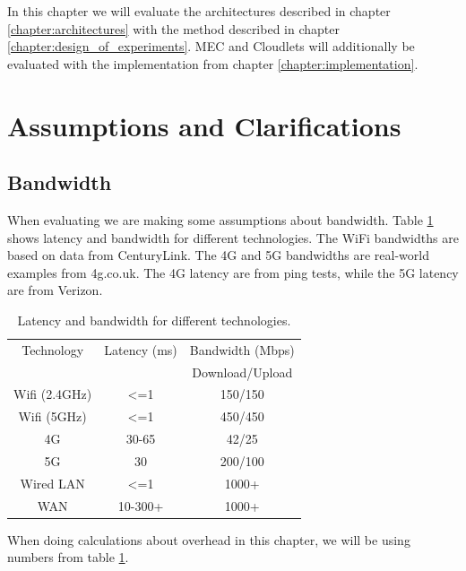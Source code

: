 In this chapter we will evaluate the architectures described in chapter \ref{chapter:architectures} with the method described in chapter \ref{chapter:design_of_experiments}. MEC and Cloudlets will additionally be evaluated with the implementation from chapter \ref{chapter:implementation}.






\section{Assumptions and Clarifications}
\subsection{Bandwidth}
When evaluating we are making some assumptions about bandwidth. Table \ref{tab:Bandwidth_latency} shows latency and bandwidth for different technologies. The WiFi bandwidths are based on data from CenturyLink\cite{noauthor_24_nodate}. The 4G and 5G bandwidths are real-world examples from 4g.co.uk\cite{noauthor_how_nodate}. The 4G latency are from ping tests, while the 5G latency are from Verizon\cite{noauthor_what_2020}.

\begin{table}[h!]
    \centering
    \begin{tabular}[c]{|c|c|c|}
        \hline
        Technology & Latency (ms) & Bandwidth (Mbps) \\
            &   &  Download/Upload \\
        \hline
        \hline
        Wifi (2.4GHz) & <=1 & 150/150  \\
        \hline
        Wifi (5GHz) & <=1 & 450/450  \\
        \hline
        4G & 30-65 & 42/25  \\
        \hline
        5G & 30 & 200/100  \\
        \hline
        Wired LAN & <=1 & 1000+  \\
        \hline
        WAN & 10-300+ & 1000+  \\
        \hline
        
        
    \end{tabular}
    \caption{Latency and bandwidth for different technologies.}
    \label{tab:Bandwidth_latency}
\end{table}
When doing calculations about overhead in this chapter, we will be using numbers from table \ref{tab:Bandwidth_latency}.





